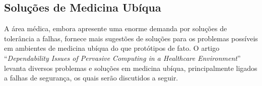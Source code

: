 % 
% 
% 
% 
% 


\subsection{Soluções de Medicina Ubíqua} %

A área médica, embora apresente uma enorme demanda por soluções de tolerância a falhas, fornece mais sugestões de soluções para os problemas possíveis em ambientes de medicina ubíqua do que protótipos de fato. O artigo ``\emph{Dependability Issues of Pervasive Computing in a Healthcare Environment}''~\cite{bohn2004dependability} levanta diversos problemas e soluções em medicina ubíqua, principalmente ligados a falhas de segurança, os quais serão discutidos a seguir.

